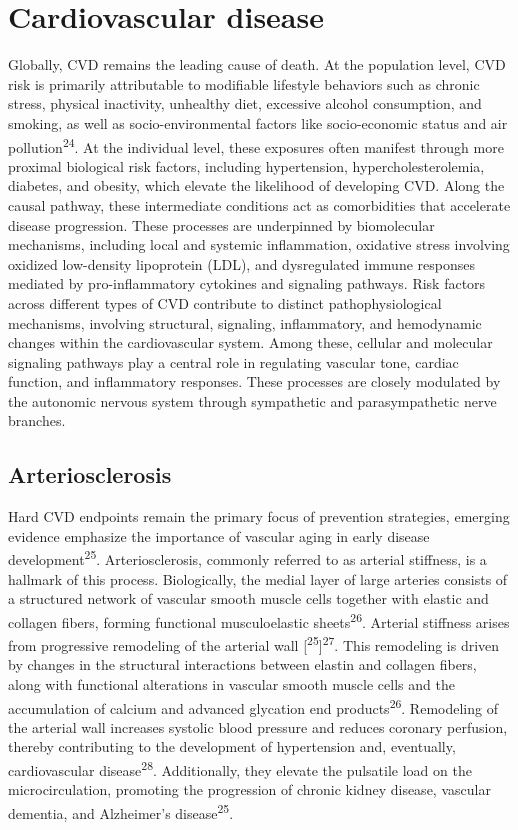 \documentclass[
  a4paper,
  headsepline=true,
  open=any]{scrbook}
\begin{document}
\hypertarget{cardiovascular-disease}{%
\section{Cardiovascular disease}\label{cardiovascular-disease}}

Globally, CVD remains the leading cause of death. At the population
level, CVD risk is primarily attributable to modifiable lifestyle
behaviors such as chronic stress, physical inactivity, unhealthy diet,
excessive alcohol consumption, and smoking, as well as
socio-environmental factors like socio-economic status and air
pollution\textsuperscript{24}. At the individual level, these exposures
often manifest through more proximal biological risk factors, including
hypertension, hypercholesterolemia, diabetes, and obesity, which elevate
the likelihood of developing CVD. Along the causal pathway, these
intermediate conditions act as comorbidities that accelerate disease
progression. These processes are underpinned by biomolecular mechanisms,
including local and systemic inflammation, oxidative stress involving
oxidized low-density lipoprotein (LDL), and dysregulated immune
responses mediated by pro-inflammatory cytokines and signaling pathways.
Risk factors across different types of CVD contribute to distinct
pathophysiological mechanisms, involving structural, signaling,
inflammatory, and hemodynamic changes within the cardiovascular system.
Among these, cellular and molecular signaling pathways play a central
role in regulating vascular tone, cardiac function, and inflammatory
responses. These processes are closely modulated by the autonomic
nervous system through sympathetic and parasympathetic nerve branches.

\hypertarget{arteriosclerosis}{%
\subsection{Arteriosclerosis}\label{arteriosclerosis}}

Hard CVD endpoints remain the primary focus of prevention strategies,
emerging evidence emphasize the importance of vascular aging in early
disease development\textsuperscript{25}. Arteriosclerosis, commonly
referred to as arterial stiffness, is a hallmark of this process.
Biologically, the medial layer of large arteries consists of a
structured network of vascular smooth muscle cells together with elastic
and collagen fibers, forming functional musculoelastic
sheets\textsuperscript{26}. Arterial stiffness arises from progressive
remodeling of the arterial wall
{[}\textsuperscript{25}{]}\textsuperscript{27}. This remodeling is
driven by changes in the structural interactions between elastin and
collagen fibers, along with functional alterations in vascular smooth
muscle cells and the accumulation of calcium and advanced glycation end
products\textsuperscript{26}. Remodeling of the arterial wall increases
systolic blood pressure and reduces coronary perfusion, thereby
contributing to the development of hypertension and, eventually,
cardiovascular disease\textsuperscript{28}. Additionally, they elevate
the pulsatile load on the microcirculation, promoting the progression of
chronic kidney disease, vascular dementia, and Alzheimer's
disease\textsuperscript{25}.
\end{document}
